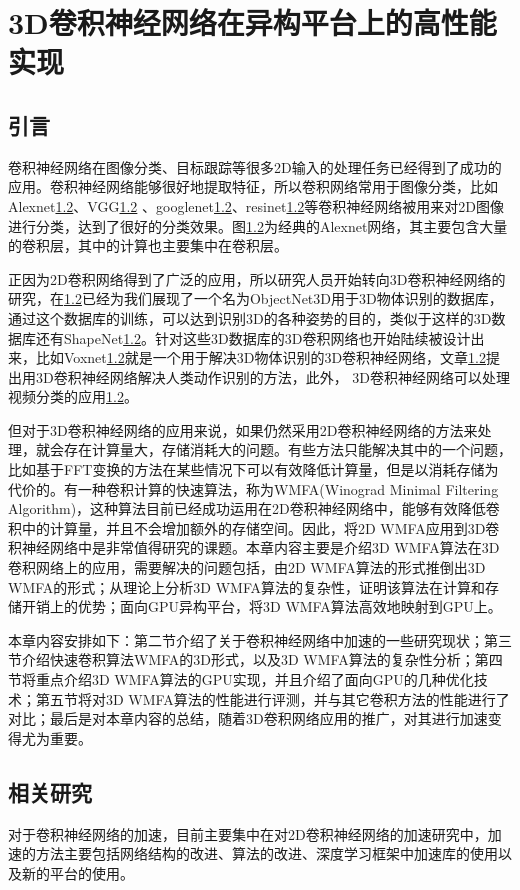 \chapter{3D卷积神经网络在异构平台上的高性能实现}
\label{3DWinograd}
\section{引言}
卷积神经网络在图像分类、目标跟踪等很多2D输入的处理任务已经得到了成功的应用。卷积神经网络能够很好地提取特征，所以卷积网络常用于图像分类，比如Alexnet\ref{}、VGG\ref{} 、googlenet\ref{}、resinet\ref{}等卷积神经网络被用来对2D图像进行分类，达到了很好的分类效果。图\ref{}为经典的Alexnet网络，其主要包含大量的卷积层，其中的计算也主要集中在卷积层。

正因为2D卷积网络得到了广泛的应用，所以研究人员开始转向3D卷积神经网络的研究，在\ref{}已经为我们展现了一个名为ObjectNet3D用于3D物体识别的数据库，通过这个数据库的训练，可以达到识别3D的各种姿势的目的，类似于这样的3D数据库还有ShapeNet\ref{}。针对这些3D数据库的3D卷积网络也开始陆续被设计出来，比如Voxnet\ref{}就是一个用于解决3D物体识别的3D卷积神经网络，文章\ref{}提出用3D卷积神经网络解决人类动作识别的方法，此外， 3D卷积神经网络可以处理视频分类的应用\ref{}。

但对于3D卷积神经网络的应用来说，如果仍然采用2D卷积神经网络的方法来处理，就会存在计算量大，存储消耗大的问题。有些方法只能解决其中的一个问题，比如基于FFT变换的方法在某些情况下可以有效降低计算量，但是以消耗存储为代价的。有一种卷积计算的快速算法，称为WMFA(Winograd Minimal Filtering Algorithm)，这种算法目前已经成功运用在2D卷积神经网络中，能够有效降低卷积中的计算量，并且不会增加额外的存储空间。因此，将2D WMFA应用到3D卷积神经网络中是非常值得研究的课题。本章内容主要是介绍3D WMFA算法在3D卷积网络上的应用，需要解决的问题包括，由2D WMFA算法的形式推倒出3D WMFA的形式；从理论上分析3D WMFA算法的复杂性，证明该算法在计算和存储开销上的优势；面向GPU异构平台，将3D WMFA算法高效地映射到GPU上。

本章内容安排如下：第二节介绍了关于卷积神经网络中加速的一些研究现状；第三节介绍快速卷积算法WMFA的3D形式，以及3D WMFA算法的复杂性分析；第四节将重点介绍3D WMFA算法的GPU实现，并且介绍了面向GPU的几种优化技术；第五节将对3D WMFA算法的性能进行评测，并与其它卷积方法的性能进行了对比；最后是对本章内容的总结，随着3D卷积网络应用的推广，对其进行加速变得尤为重要。

\section{相关研究}
对于卷积神经网络的加速，目前主要集中在对2D卷积神经网络的加速研究中，加速的方法主要包括网络结构的改进、算法的改进、深度学习框架中加速库的使用以及新的平台的使用。

